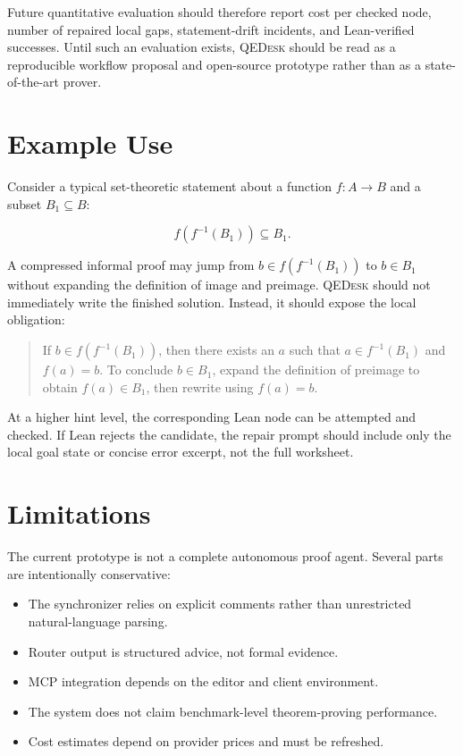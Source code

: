 \documentclass[11pt]{article}
\newcommand{\qedesk}{\textsc{QEDesk}}
\begin{document}
Future quantitative evaluation should therefore report cost per checked node,
number of repaired local gaps, statement-drift incidents, and Lean-verified
successes.  Until such an evaluation exists, \qedesk{} should be read as a
reproducible workflow proposal and open-source prototype rather than as a
state-of-the-art prover.

\section{Example Use}

Consider a typical set-theoretic statement about a function
\(f : A \to B\) and a subset \(B_1 \subseteq B\):

\[
  f(f^{-1}(B_1)) \subseteq B_1.
\]

A compressed informal proof may jump from
\(b \in f(f^{-1}(B_1))\) to \(b \in B_1\) without expanding the definition of
image and preimage.  \qedesk{} should not immediately write the finished
solution.  Instead, it should expose the local obligation:

\begin{quote}
If \(b \in f(f^{-1}(B_1))\), then there exists an \(a\) such that
\(a \in f^{-1}(B_1)\) and \(f(a)=b\).  To conclude \(b \in B_1\), expand the
definition of preimage to obtain \(f(a) \in B_1\), then rewrite using
\(f(a)=b\).
\end{quote}

At a higher hint level, the corresponding Lean node can be attempted and
checked.  If Lean rejects the candidate, the repair prompt should include only
the local goal state or concise error excerpt, not the full worksheet.

\section{Limitations}

The current prototype is not a complete autonomous proof agent.  Several parts
are intentionally conservative:

\begin{itemize}[leftmargin=2em]
  \item The synchronizer relies on explicit comments rather than unrestricted
  natural-language parsing.
  \item Router output is structured advice, not formal evidence.
  \item MCP integration depends on the editor and client environment.
  \item The system does not claim benchmark-level theorem-proving performance.
  \item Cost estimates depend on provider prices and must be refreshed.
\end{itemize}
\end{document}
